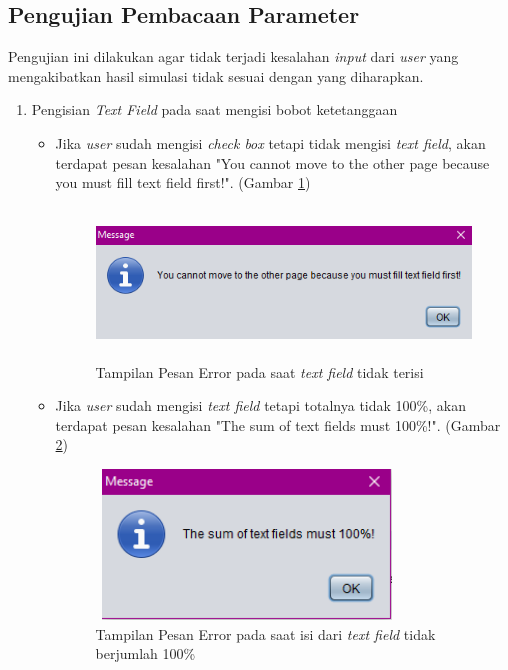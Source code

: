 \subsection{Pengujian Pembacaan Parameter}
Pengujian ini dilakukan agar tidak terjadi kesalahan \textit{input} dari \textit{user} yang mengakibatkan hasil simulasi tidak sesuai dengan yang diharapkan.
\begin{enumerate}
	\item Pengisian \textit{Text Field} pada saat mengisi bobot ketetanggaan
	\begin{itemize}
		\item Jika \textit{user} sudah mengisi \textit{check box} tetapi tidak mengisi \textit{text field}, akan terdapat pesan kesalahan "You cannot move to the other page because you must fill text field first!". (Gambar \ref{pesanError1})
		
	\begin{figure} [H]
	\centering  
	\includegraphics[width=12cm, height=4cm]{pesanError2} 
		\caption[Tampilan Pesan Error pada saat \textit{text field} tidak terisi]{Tampilan Pesan Error pada saat \textit{text field} tidak terisi}
	\label{pesanError1} 
\end{figure}
		
		\item Jika \textit{user} sudah mengisi \textit{text field} tetapi totalnya tidak 100\%, akan terdapat pesan kesalahan "The sum of text fields must 100\%!". (Gambar \ref{pesanError2})
		
	\begin{figure} [H]
	\centering  
	\includegraphics[width=8cm, height=4cm]{pesanError1} 
		\caption[Tampilan Pesan Error pada saat isi dari \textit{text field} tidak berjumlah 100\%]{Tampilan Pesan Error pada saat isi dari \textit{text field} tidak berjumlah 100\%}
	\label{pesanError2} 
\end{figure}


\end{itemize}
\end{enumerate}
